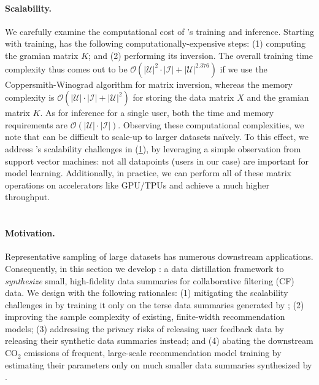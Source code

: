 \documentclass{article}
\begin{document}
\paragraph{Scalability.} We carefully examine the computational cost of \model's training and inference. Starting with training, \model has the following computationally-expensive steps: (1) computing the gramian matrix $K$; and (2) performing its inversion. The overall training time complexity thus comes out to be $\mathcal{O}(|\mathcal{U}|^2 \cdot |\mathcal{I}| + |\mathcal{U}|^{2.376})$ if we use the Coppersmith-Winograd algorithm \cite{matrix_inverse} for matrix inversion, whereas the memory complexity is $\mathcal{O}(|\mathcal{U}| \cdot |\mathcal{I}| + |\mathcal{U}|^2)$ for storing the data matrix $X$ and the gramian matrix $K$. As for inference for a single user, both the time and memory requirements are $\mathcal{O}(|\mathcal{U}| \cdot |\mathcal{I}|)$. Observing these computational complexities, we note that \model can be difficult to scale-up to larger datasets na\"ively. To this effect, we address \model's scalability challenges in \sampler (\cref{sec:distillation}), by leveraging a simple observation from support vector machines: not all datapoints (users in our case) are important for model learning. Additionally, in practice, we can perform all of these matrix operations on accelerators like GPU/TPUs and achieve a much higher throughput.

\section{\sampler} \label{sec:distillation}
\paragraph{Motivation.} 
Representative sampling of large datasets has numerous downstream applications. Consequently, in this section we develop \sampler: a data distillation framework to \emph{synthesize} small, high-fidelity data summaries for collaborative filtering (CF) data. We design \sampler with the following rationales: (1) mitigating the scalability challenges in \model by training it only on the terse data summaries generated by \sampler; (2) improving the sample complexity of existing, finite-width recommendation models; (3) addressing the privacy risks of releasing user feedback data by releasing their synthetic data summaries instead; and (4) abating the downstream CO$_2$ emissions of frequent, large-scale recommendation model training by estimating their parameters only on much smaller data summaries synthesized by \sampler. 
\end{document}
